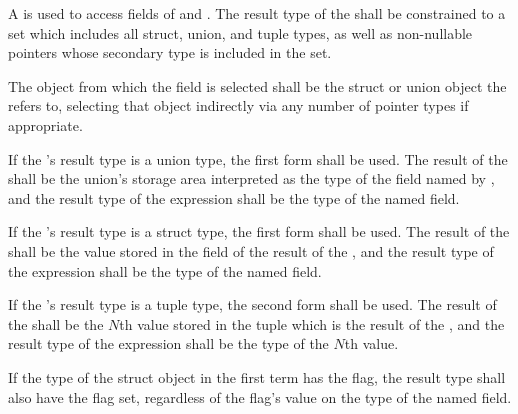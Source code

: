 \specsubsubitem
A  is used to access fields of
 and . The result type
of the  shall be constrained to a set which
includes all struct, union, and tuple types, as well as non-nullable pointers
whose secondary type is included in the set.


\specsubsubitem
The object from which the field is selected shall be the struct or union object
the  refers to, selecting that object indirectly
via any number of pointer types if appropriate.

\specsubsubitem
If the 's result type is a union type, the
first form shall be used. The result of the
 shall be the union's storage area
interpreted as the type of the field named by , and the
result type of the expression shall be the type of the named field.

\specsubsubitem
If the 's result type is a struct type, the
first form shall be used. The result of the
 shall be the value stored in the
 field of the result of the ,
and the result type of the expression shall be the type of the named field.

\specsubsubitem
If the 's result type is a tuple type,
the second form shall be used. The result of the
 shall be the $N$th value stored in the
tuple which is the result of the , and the
result type of the expression shall be the type of the $N$th value.

\specsubsubitem
If the type of the struct object in the first term has the 
flag, the result type shall also have the  flag set, regardless
of the flag's value on the type of the named field.


\begin{grammar}
 \\
	 \terminal{[}  \terminal{]} \\
\end{grammar}

